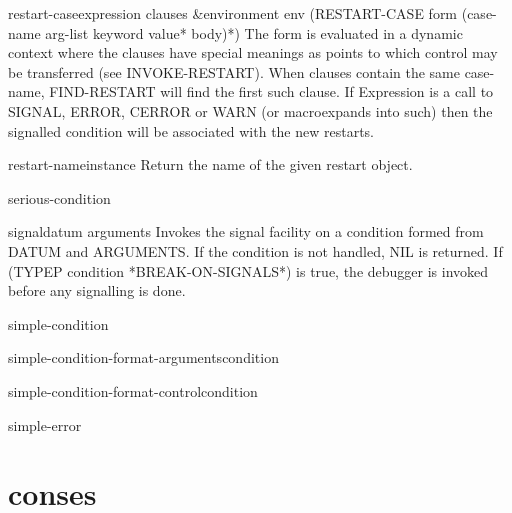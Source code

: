 \begin{macro}{restart-case}{expression \body clauses &environment env}{}
  (RESTART-CASE form
   {(case-name arg-list {keyword value}* body)}*)
   The form is evaluated in a dynamic context where the clauses have special
   meanings as points to which control may be transferred (see INVOKE-RESTART).
   When clauses contain the same case-name, FIND-RESTART will find the first
   such clause. If Expression is a call to SIGNAL, ERROR, CERROR or WARN (or
   macroexpands into such) then the signalled condition will be associated with
   the new restarts.
\end{macro}

\begin{function}{restart-name}{instance}{}
  Return the name of the given restart object.
\end{function}

\begin{condition-type}{serious-condition}{}{}
  
\end{condition-type}

\begin{function}{signal}{datum \rest arguments}{}
  Invokes the signal facility on a condition formed from DATUM and
   ARGUMENTS. If the condition is not handled, NIL is returned. If
   (TYPEP condition *BREAK-ON-SIGNALS*) is true, the debugger is invoked
   before any signalling is done.
\end{function}

\begin{condition-type}{simple-condition}{}{}
  
\end{condition-type}

\begin{function}{simple-condition-format-arguments}{condition}{}
  
\end{function}

\begin{function}{simple-condition-format-control}{condition}{}
  
\end{function}

\begin{condition-type}{simple-error}{}{}
  
\end{condition-type}

\section{conses}

